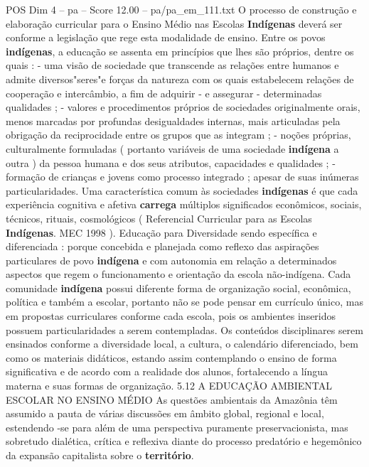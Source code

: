 \begin{textsample}{POS Dim 4 – pa – Score 12.00 – pa/pa\_em\_111.txt}  \label{ex:f4_pos_013}
O processo de construção e elaboração curricular para o Ensino Médio nas Escolas \textbf{Indígenas} deverá ser conforme a legislação que rege esta modalidade de ensino.
Entre os povos \textbf{indígenas}, a educação se assenta em princípios que lhes são próprios, dentre os quais : - uma visão de sociedade que transcende as relações entre humanos e admite diversos"seres"e forças da natureza com os quais estabelecem relações de cooperação e intercâmbio, a fim de adquirir - e assegurar - determinadas qualidades ; - valores e procedimentos próprios de sociedades originalmente orais, menos marcadas por profundas desigualdades internas, mais articuladas pela obrigação da reciprocidade entre os grupos que as integram ; - noções próprias, culturalmente formuladas ( portanto variáveis de uma sociedade \textbf{indígena} a outra ) da pessoa humana e dos seus atributos, capacidades e qualidades ; - formação de crianças e jovens como processo integrado ; apesar de suas inúmeras particularidades.
Uma característica comum às sociedades \textbf{indígenas} é que cada experiência cognitiva e afetiva \textbf{carrega} múltiplos significados econômicos, sociais, técnicos, rituais, cosmológicos ( Referencial Curricular para as Escolas \textbf{Indígenas}.
MEC 1998 ).
Educação para Diversidade sendo específica e diferenciada : porque concebida e planejada como reflexo das aspirações particulares de povo \textbf{indígena} e com autonomia em relação a determinados aspectos que regem o funcionamento e orientação da escola não-indígena.
Cada comunidade \textbf{indígena} possui diferente forma de organização social, econômica, política e também a escolar, portanto não se pode pensar em currículo único, mas em propostas curriculares conforme cada escola, pois os ambientes inseridos possuem particularidades a serem contempladas.
Os conteúdos disciplinares serem ensinados conforme a diversidade local, a cultura, o calendário diferenciado, bem como os materiais didáticos, estando assim contemplando o ensino de forma significativa e de acordo com a realidade dos alunos, fortalecendo a língua materna e suas formas de organização. 5.12 A EDUCAÇÃO AMBIENTAL ESCOLAR NO ENSINO MÉDIO As questões ambientais da Amazônia têm assumido a pauta de várias discussões em âmbito global, regional e local, estendendo -se para além de uma perspectiva puramente preservacionista, mas sobretudo dialética, crítica e reflexiva diante do processo predatório e hegemônico da expansão capitalista sobre o \textbf{território}.

\end{textsample}

